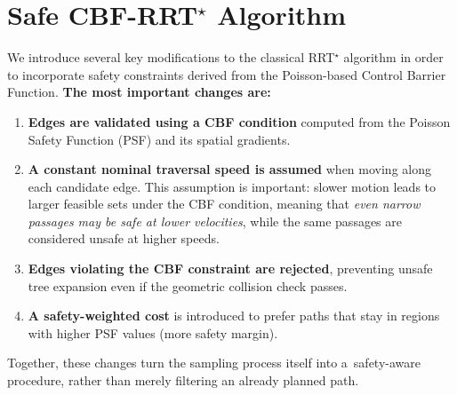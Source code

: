 \documentclass[letterpaper, 10 pt, conference]{ieeeconf}
\begin{document}

\section{Safe CBF-RRT$^\star$ Algorithm}
We introduce several key modifications to the classical RRT$^\star$
algorithm in order to incorporate safety constraints derived from
the Poisson-based Control Barrier Function.
\textbf{The most important changes are:}
\begin{enumerate}
    \item \textbf{Edges are validated using a CBF condition} computed
    from the Poisson Safety Function (PSF) and its spatial gradients.

    \item \textbf{A constant nominal traversal speed is assumed} when
    moving along each candidate edge. This assumption is important: 
    slower motion leads to larger feasible sets under the CBF condition,
    meaning that \emph{even narrow passages may be safe at lower velocities},
    while the same passages are considered unsafe at higher speeds.

    \item \textbf{Edges violating the CBF constraint are rejected},
    preventing unsafe tree expansion even if the geometric collision
    check passes.

    \item \textbf{A safety-weighted cost} is introduced to prefer paths
    that stay in regions with higher PSF values (more safety margin).
\end{enumerate}

Together, these changes turn the sampling process itself into
a~safety-aware procedure, rather than merely filtering an already planned path.
\end{document}
